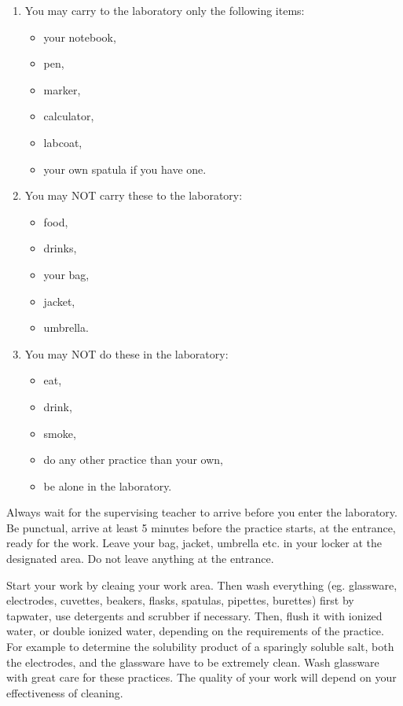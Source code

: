\begin{enumerate}
\item You may carry to the laboratory only the following items:
	\begin{itemize}
	\item your notebook,
	\item pen,
	\item marker,
	\item calculator,
	\item labcoat,
	\item your own spatula if you have one.
	\end{itemize}
\item You may NOT carry these to the laboratory:
	\begin{itemize}
	\item food,
	\item drinks,
	\item your bag,
	\item jacket,
	\item umbrella.
	\end{itemize}
\item You may NOT do these in the laboratory:
	\begin{itemize}
	\item eat,
	\item drink,
	\item smoke,
	\item do any other practice than your own,
	\item be alone in the laboratory.
	\end{itemize}
\end{enumerate}

Always wait for the supervising teacher to arrive before you enter the laboratory. Be punctual, arrive at least 5 minutes before the practice starts, at the entrance, ready for the work. Leave your bag, jacket, umbrella etc. in your locker at the designated area. Do not leave anything at the entrance.
	
Start your work by cleaing your work area. Then wash everything (eg. glassware, electrodes, cuvettes, beakers, flasks, spatulas, pipettes, burettes) first by tapwater, use detergents and scrubber if necessary. Then, flush it with ionized water, or double ionized water, depending on the requirements of the practice. For example to determine the solubility product of a sparingly soluble salt, both the electrodes, and the glassware have to be extremely clean. Wash glassware with great care for these practices. The quality of your work will depend on your effectiveness of cleaning.

